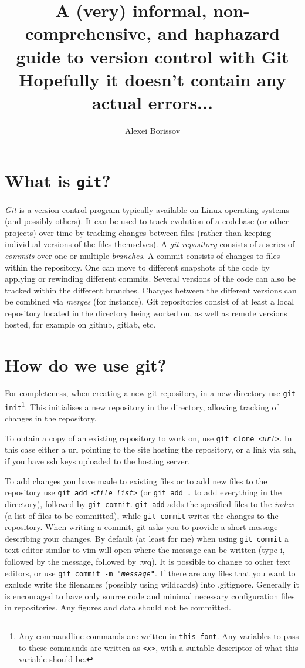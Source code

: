 \documentclass{article}
\title{A (very) informal, non-comprehensive, and haphazard guide to version control with Git \\ \tiny{Hopefully it doesn't contain any actual errors...}}
\author{Alexei Borissov}
\newcommand{\code}[1]{\texttt{#1}}
\newcommand{\ital}[1]{\textit{#1}}
\begin{document}
\maketitle

\section{What is \code{git}?}
\ital{Git} is a version control program typically available on Linux operating systems (and possibly others). It can be used to track evolution of a codebase (or other projects) over time by tracking changes between files (rather than keeping individual versions of the files themselves). A \ital{git repository} consists of a series of \ital{commits} over one or multiple \ital{branches}. A commit consists of changes to files within the repository. One can move to different snapshots of the code by applying or rewinding different commits. Several versions of the code can also be tracked within the different branches. Changes between the different versions can be combined via \ital{merges} (for instance). Git repositories consist of at least a local repository located in the directory being worked on, as well as remote versions hosted, for example on github, gitlab, etc. 

\section{How do we use git?}
For completeness, when creating a new git repository, in a new directory use \code{git init}\footnote{Any commandline commands are written in \code{this font}. Any variables to pass to these commands are written as \code{<\ital{x}>}, with a suitable descriptor of what this variable should be.}. This initialises a new repository in the directory, allowing tracking of changes in the repository. 

To obtain a copy of an existing repository to work on, use \code{git clone <\ital{url}>}. In this case either a url pointing to the site hosting the repository, or a link via ssh, if you have ssh keys uploaded to the hosting server. 

To add changes you have made to existing files or to add new files to the repository use \code{git add <\ital{file list}>} (or \code{git add .} to add everything in the directory), followed by \code{git commit}. \code{git add} adds the specified files to the \ital{index} (a list of files to be committed), while \code{git commit} writes the changes to the repository. When writing a commit, git asks you to provide a short message describing your changes. By default (at least for me) when using \code{git commit} a text editor similar to vim will open where the message can be written (type i, followed by the message, followed by :wq). It is possible to change to other text editors, or use \code{git commit -m "\ital{message}"}. If there are any files that you want to exclude write the filenames (possibly using wildcards) into .gitignore. Generally it is encouraged to have only source code and minimal necessary configuration files in repositories. Any figures and data should not be committed.
\end{document}
